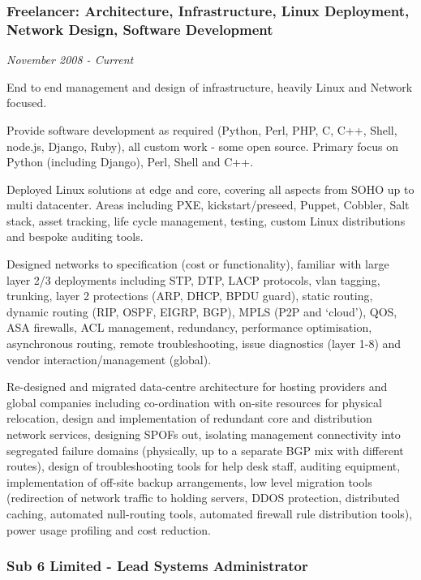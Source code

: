 \subsubsection{Freelancer: Architecture, Infrastructure, Linux
Deployment, Network Design, Software
Development}\label{freelancer-architecture-infrastructure-linux-deployment-network-design-software-development}

\emph{November 2008 - Current}

End to end management and design of infrastructure, heavily Linux and
Network focused.

Provide software development as required (Python, Perl, PHP, C, C++,
Shell, node.js, Django, Ruby), all custom work - some open source.
Primary focus on Python (including Django), Perl, Shell and C++.

Deployed Linux solutions at edge and core, covering all aspects from
SOHO up to multi datacenter. Areas including PXE, kickstart/preseed,
Puppet, Cobbler, Salt stack, asset tracking, life cycle management,
testing, custom Linux distributions and bespoke auditing tools.

Designed networks to specification (cost or functionality), familiar
with large layer 2/3 deployments including STP, DTP, LACP protocols,
vlan tagging, trunking, layer 2 protections (ARP, DHCP, BPDU guard),
static routing, dynamic routing (RIP, OSPF, EIGRP, BGP), MPLS (P2P and
`cloud'), QOS, ASA firewalls, ACL management, redundancy, performance
optimisation, asynchronous routing, remote troubleshooting, issue
diagnostics (layer 1-8) and vendor interaction/management (global).

Re-designed and migrated data-centre architecture for hosting providers
and global companies including co-ordination with on-site resources for
physical relocation, design and implementation of redundant core and
distribution network services, designing SPOFs out, isolating management
connectivity into segregated failure domains (physically, up to a
separate BGP mix with different routes), design of troubleshooting tools
for help desk staff, auditing equipment, implementation of off-site
backup arrangements, low level migration tools (redirection of network
traffic to holding servers, DDOS protection, distributed caching,
automated null-routing tools, automated firewall rule distribution
tools), power usage profiling and cost reduction.

\subsubsection{Sub 6 Limited - Lead Systems
Administrator}\label{sub-6-limited---lead-systems-administrator}

